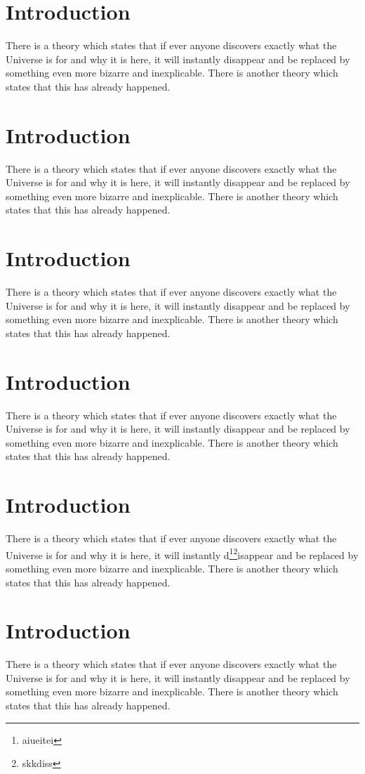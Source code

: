 \documentclass[a4paper,papersize,10pt,twoside,uplatex,dvipdfmx]{jsarticle}
\begin{document}
\section{Introduction}
There is a theory which states that if ever anyone discovers exactly what the Universe is for and why it is here, it will instantly disappear and be replaced by something even more bizarre and inexplicable.
There is another theory which states that this has already happened.

\section{Introduction}
There is a theory which states that if ever anyone discovers exactly what the Universe is for and why it is here, it will instantly disappear and be replaced by something even more bizarre and inexplicable.
There is another theory which states that this has already happened.

\section{Introduction}
There is a theory which states that if ever anyone discovers exactly what the Universe is for and why it is here, it will instantly disappear and be replaced by something even more bizarre and inexplicable.
There is another theory which states that this has already happened.

\section{Introduction}
There is a theory which states that if ever anyone discovers exactly what the Universe is for and why it is here, it will instantly disappear and be replaced by something even more bizarre and inexplicable.
There is another theory which states that this has already happened.

\section{Introduction}
There is a theory which states that if ever anyone discovers exactly what the Universe is for and why it is here, it will instantly d\footnote{aiueitei}\footnote{skkdiss}isappear and be replaced by something even more bizarre and inexplicable.
There is another theory which states that this has already happened.

\section{Introduction}
There is a theory which states that if ever anyone discovers exactly what the Universe is for and why it is here, it will instantly disappear and be replaced by something even more bizarre and inexplicable.
There is another theory which states that this has already happened.
\end{document}
